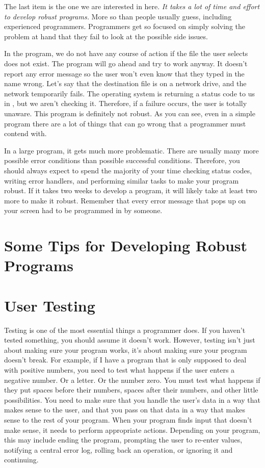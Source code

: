 The last item is the one we are interested in here.  \emph{It takes a lot
of time and effort to develop robust programs.}  More so than 
people usually guess, including experienced programmers.  Programmers get
so focused on simply solving the problem at hand that they fail to look at
the possible side issues.  

In the  program, we
do not have any course of action if the file the user selects does not 
exist.  The program will go ahead and try to work anyway.  It doesn't report
any error message so the user won't even know that they typed in the name
wrong.  Let's say that the destination file is on a network drive, and the
network temporarily fails.  The operating system is returning a 
status code
to us in {\eaxRegIdx}, but we aren't checking it.  Therefore, if a failure
occurs, the user is totally unaware.  This program is definitely not
robust.  As you can see, even in a simple program there are a lot of
things that can go wrong that a programmer must contend with.

In a large program, it gets much more problematic.  There are usually many
more possible error conditions than 
possible successful conditions. 
Therefore, you should always expect to spend the majority of your time
checking status codes, writing error handlers, and performing similar tasks
to make your program robust.  If it takes two weeks to develop a program,
it will likely take at least two more to make it 
robust.  Remember that
every error message that pops up on your screen had to be programmed in by
someone.

\section{Some Tips for Developing Robust Programs}

\section{User Testing}

Testing is one of the most essential things a programmer does.  If you haven't
tested something, you should assume it doesn't work.  However, testing isn't
just about making sure your program works, it's about making sure your
program doesn't break.  For example, if I have a program that is only supposed
to deal with positive numbers, you need to test what happens if the user enters
a negative number.  Or a letter.  Or the number zero.  You must test what 
happens if they put spaces before their numbers, spaces after their numbers, 
and other little possibilities.  You need to make sure that you handle the
user's data in a way that makes sense to the user, and that you pass on that
data in a way that makes sense to the rest of your program.  When your program
finds input that doesn't make sense, it needs to perform appropriate actions.
Depending on your program, this may include ending the program, prompting
the user to re-enter values, notifying a central error log, rolling
back an operation, or ignoring it and continuing.

